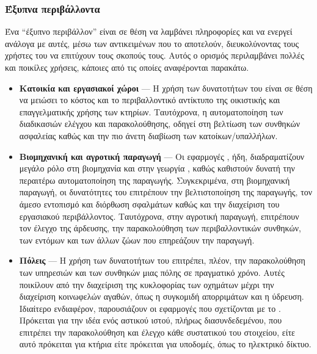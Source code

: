 \subsubsection{Έξυπνα περιβάλλοντα}
Ένα ``έξυπνο περιβάλλον'' είναι σε θέση να λαμβάνει πληροφορίες και να ενεργεί ανάλογα με αυτές, μέσω των αντικειμένων που το αποτελούν, διευκολύνοντας τους χρήστες του να επιτύχουν τους σκοπούς τους. Αυτός ο ορισμός περιλαμβάνει πολλές και ποικίλες χρήσεις, κάποιες από τις οποίες αναφέρονται παρακάτω. 
\begin{itemize}
    \item \textbf{Κατοικία και εργασιακοί χώροι} --- Η χρήση των δυνατοτήτων του  είναι σε θέση να μειώσει το κόστος και το περιβαλλοντικό αντίκτυπο της οικιστικής και επαγγελματικής χρήσης των κτηρίων\cite{iothome}. Ταυτόχρονα, η αυτοματοποίηση των διαδικασιών ελέγχου και παρακολούθησης, οδηγεί στη βελτίωση των συνθηκών ασφαλείας καθώς και την πιο άνετη διαβίωση των κατοίκων/υπαλλήλων.
    \item \textbf{Βιομηχανική και αγροτική παραγωγή} --- Οι εφαρμογές , ήδη, διαδραματίζουν μεγάλο ρόλο στη βιομηχανία \cite{iotmanuf} και στην γεωργία \cite{iotagric}, καθώς καθιστούν δυνατή την περαιτέρω αυτοματοποίηση της παραγωγής.
    Συγκεκριμένα, στη βιομηχανική παραγωγή, οι δυνατότητες του  επιτρέπουν την βελτιστοποίηση της παραγωγής, τον άμεσο εντοπισμό και διόρθωση σφαλμάτων καθώς και την διαχείριση του εργασιακού περιβάλλοντος.
    Ταυτόχρονα, στην αγροτική παραγωγή, επιτρέπουν τον έλεγχο της άρδευσης, την παρακολούθηση των περιβαλλοντικών συνθηκών, των εντόμων και των άλλων ζώων που επηρεάζουν την παραγωγή.
    \item \textbf{Πόλεις} --- Η χρήση των δυνατοτήτων του  επιτρέπει, πλέον, την παρακολούθηση των υπηρεσιών και των συνθηκών μιας πόλης σε πραγματικό χρόνο.
    Αυτές ποικίλουν από την διαχείριση της κυκλοφορίας των οχημάτων μέχρι την διαχείριση κοινωφελών αγαθών, όπως η συγκομιδή απορριμάτων και η ύδρευση.
    Ιδιαίτερο ενδιαφέρον, παρουσιάζουν οι εφαρμογές που σχετίζονται με το  \cite{iotcity}.
    Πρόκειται για την ιδέα ενός αστικού ιστού, πλήρως διασυνδεδεμένου, που επιτρέπει την παρακολούθηση και έλεγχο κάθε συστατικού του στοιχείου, είτε αυτό πρόκειται για κτήρια είτε πρόκειται για υποδομές, όπως το ηλεκτρικό δίκτυο.
\end{itemize}
